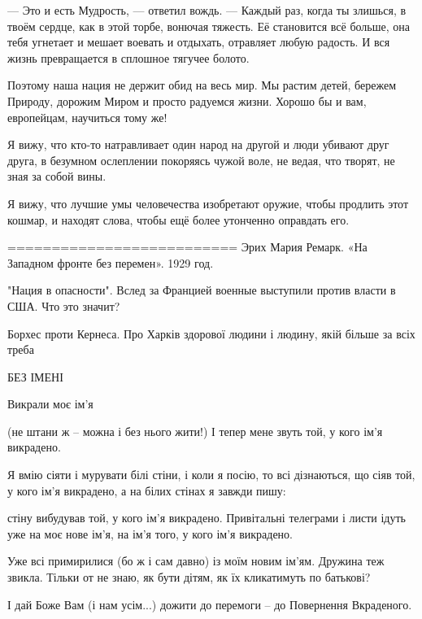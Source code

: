 — Это и есть Мудрость, — ответил вождь. — Каждый раз, когда ты злишься, в твоём
сердце, как в этой торбе, вонючая тяжесть. Её становится всё больше, она тебя
угнетает и мешает воевать и отдыхать, отравляет любую радость. И вся жизнь
превращается в сплошное тягучее болото.

Поэтому наша нация не держит обид на весь мир. Мы растим детей, бережем
Природу, дорожим Миром и просто радуемся жизни. Хорошо бы и вам, европейцам,
научиться тому же!

Я вижу, что кто-то натравливает один народ на другой и люди убивают друг друга, в безумном ослеплении покоряясь чужой воле, не ведая, что творят, не зная за собой вины.

Я вижу, что лучшие умы человечества изобретают оружие, чтобы продлить этот кошмар, и находят слова, чтобы ещё более утонченно оправдать его.

==========================
Эрих Мария Ремарк. «На Западном фронте без перемен». 1929 год.

"Нация в опасности". Вслед за Францией военные выступили против власти в США. Что это значит?

Борхес проти Кернеса. Про Харків здорової людини і людину, якій більше за всіх треба


БЕЗ ІМЕНІ

Викрали моє ім’я

(не штани ж – можна і без нього жити!)
І тепер мене звуть
той, у кого ім’я викрадено.

Я вмію сіяти і мурувати білі стіни,
і коли я посію, то всі дізнаються, що сіяв той,
у кого ім’я викрадено,
а на білих стінах я завжди пишу:

стіну вибудував той, у кого ім’я викрадено.
Привітальні телеграми і листи
ідуть уже на моє нове ім’я,
на ім’я того, у кого ім’я викрадено.

Уже всі примирилися (бо ж і сам давно)
із моїм новим ім’ям.
Дружина теж звикла.
Тільки от не знаю, як бути дітям,
як їх кликатимуть по батькові?

І дай Боже Вам (і нам усім...) дожити до перемоги – до Повернення Вкраденого.

